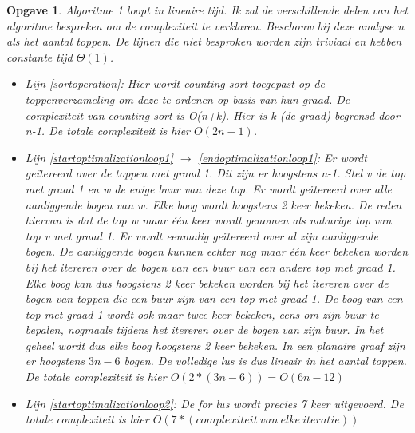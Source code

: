 \documentclass[11pt, a4paper]{article}
\newtheorem{opgave}{Opgave}
\begin{document}
\begin{opgave}
		Algoritme 1 loopt in lineaire tijd. Ik zal de verschillende delen van het algoritme bespreken om de complexiteit te verklaren. Beschouw bij deze analyse n als het aantal toppen. De lijnen die niet besproken worden zijn triviaal en hebben constante tijd $\Theta(1)$.
		\begin{itemize}
			 \item Lijn \ref{sortoperation}: Hier wordt counting sort toegepast op de toppenverzameling om deze te ordenen op basis van hun graad. De complexiteit van counting sort is O(n+k). Hier is k (de graad) begrensd door n-1. De totale complexiteit is hier $O(2n-1)$.
			 \item Lijn \ref{startoptimalizationloop1} $\rightarrow$ \ref{endoptimalizationloop1}: Er wordt ge\"{i}tereerd over de toppen met graad 1. Dit zijn er hoogstens n-1. Stel v de top met graad 1 en w de enige buur van deze top. 
			 Er wordt ge\"{i}tereerd over alle aanliggende bogen van w. Elke boog wordt hoogstens 2 keer bekeken. De reden hiervan is dat de top w maar \'{e}\'{e}n keer wordt genomen als naburige top van top v met graad 1. Er wordt eenmalig ge\"{i}tereerd over al zijn aanliggende bogen. De aanliggende bogen kunnen echter nog maar \'{e}\'{e}n keer bekeken worden bij het itereren over de bogen van een buur van een andere top met graad 1. 
			 Elke boog kan dus hoogstens 2 keer bekeken worden bij het itereren over de bogen van toppen die een buur zijn van een top met graad 1. De boog van een top met graad 1 wordt ook maar twee keer bekeken, eens om zijn buur te bepalen, nogmaals tijdens het itereren over de bogen van zijn buur. In het geheel wordt dus elke boog hoogstens 2 keer bekeken. 
			 In een planaire graaf zijn er hoogstens $3n-6$ bogen. De volledige lus is dus lineair in het aantal toppen. De totale complexiteit is hier $O(2*(3n-6)) = O(6n-12)$
			\item Lijn \ref{startoptimalizationloop2}: De for lus wordt precies 7 keer uitgevoerd. De totale complexiteit is hier 
			$O(7*(complexiteit\ van\ elke\ iteratie))$

\end{itemize}
\end{opgave}
\end{document}
